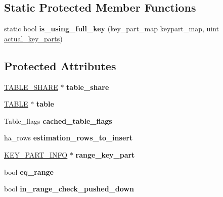 \subsection*{Static Protected Member Functions}
\begin{DoxyCompactItemize}
\item 
\mbox{\label{classhandler_ae2613bd83c495f55fe2ce05a9df2d86f}} 
static bool {\bfseries is\+\_\+using\+\_\+full\+\_\+key} (key\+\_\+part\+\_\+map keypart\+\_\+map, uint \mbox{\hyperlink{group__Query__Optimizer_ga6609ac0420a8a415d5a57cc6659f460d}{actual\+\_\+key\+\_\+parts}})
\end{DoxyCompactItemize}
\subsection*{Protected Attributes}
\begin{DoxyCompactItemize}
\item 
\mbox{\label{classhandler_a3b094cfe680aa06a7d8b70194415aa3b}} 
\mbox{\hyperlink{structTABLE__SHARE}{T\+A\+B\+L\+E\+\_\+\+S\+H\+A\+RE}} $\ast$ {\bfseries table\+\_\+share}
\item 
\mbox{\label{classhandler_abb0d051d1ef534891b27612cc4ff56f7}} 
\mbox{\hyperlink{structTABLE}{T\+A\+B\+LE}} $\ast$ {\bfseries table}
\item 
\mbox{\label{classhandler_a98743b18a24c8baef7e22a11df74d6c9}} 
Table\+\_\+flags {\bfseries cached\+\_\+table\+\_\+flags}
\item 
\mbox{\label{classhandler_adf44b6a4c101f982cd13a344dce5a870}} 
ha\+\_\+rows {\bfseries estimation\+\_\+rows\+\_\+to\+\_\+insert}
\item 
\mbox{\label{classhandler_a011df14ecc738037499572c304d8ee90}} 
\mbox{\hyperlink{classKEY__PART__INFO}{K\+E\+Y\+\_\+\+P\+A\+R\+T\+\_\+\+I\+N\+FO}} $\ast$ {\bfseries range\+\_\+key\+\_\+part}
\item 
\mbox{\label{classhandler_a272c3d9b40a9e7c5de20ed390d23a636}} 
bool {\bfseries eq\+\_\+range}
\item 
\mbox{\label{classhandler_a1a159ca294d8dafe32405e6ad546e6a4}} 
bool {\bfseries in\+\_\+range\+\_\+check\+\_\+pushed\+\_\+down}
\end{DoxyCompactItemize}
